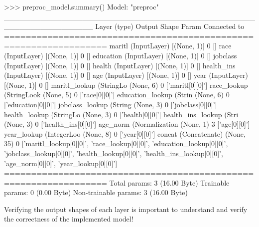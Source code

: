 \begin{samepage}
\begin{textcode}
>>> preproc_model.summary()
Model: "preproc"
_________________________________________________________________
Layer (type)            Output Shape Param Connected to                
=================================================================
maritl (InputLayer)     [(None, 1)]  0     []                            
race (InputLayer)       [(None, 1)]  0     []                            
education (InputLayer)  [(None, 1)]  0     []                            
jobclass (InputLayer)   [(None, 1)]  0     []                            
health (InputLayer)     [(None, 1)]  0     []                            
health_ins (InputLayer) [(None, 1)]  0     []                            
age (InputLayer)        [(None, 1)]  0     []                            
year (InputLayer)       [(None, 1)]  0     []                            
maritl_lookup (StringLo (None, 6)    0     ['maritl[0][0]']              
race_lookup (StringLook (None, 5)    0     ['race[0][0]']                
education_lookup (Strin (None, 6)    0     ['education[0][0]']           
jobclass_lookup (String (None, 3)    0     ['jobclass[0][0]']            
health_lookup (StringLo (None, 3)    0     ['health[0][0]']              
health_ins_lookup (Stri (None, 3)    0     ['health_ins[0][0]']          
age_norm (Normalization (None, 1)    3     ['age[0][0]']                 
year_lookup (IntegerLoo (None, 8)    0     ['year[0][0]']                
concat (Concatenate)    (None, 35)   0     ['maritl_lookup[0][0]',       
                                            'race_lookup[0][0]',         
                                            'education_lookup[0][0]',    
                                            'jobclass_lookup[0][0]',     
                                            'health_lookup[0][0]',       
                                            'health_ins_lookup[0][0]',   
                                            'age_norm[0][0]',            
                                            'year_lookup[0][0]']         
=================================================================
Total params: 3 (16.00 Byte)
Trainable params: 0 (0.00 Byte)
Non-trainable params: 3 (16.00 Byte)
\end{textcode}
\end{samepage}

\begin{tcolorbox}[colback=alert]
Verifying the output shapes of each layer is important to understand and verify the correctness of the implemented model!
\end{tcolorbox}

